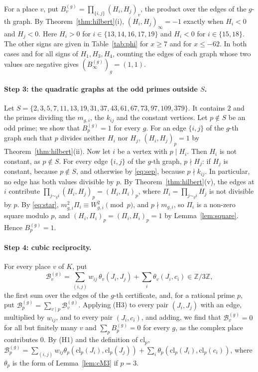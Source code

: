 \documentclass[11pt]{article}
\newcommand{\Z}{\mathbb{Z}}
\begin{document}
For a place $v$, put $B^{(g)}_v=\prod_{\{i,j\}}(H_i,H_j)_v$, the product over the edges of the $g$-th graph. By Theorem~\ref{thm:hilbert}(i), $(H_i,H_j)_\infty=-1$ exactly when $H_i<0$ and $H_j<0$. Here $H_i>0$ for $i\in\{13,\allowbreak 14,\allowbreak 16,\allowbreak 17,\allowbreak 19\}$ and $H_i<0$ for $i\in\{15,\allowbreak 18\}$. The other signs are given in Table~\ref{tab:phi} for $x\geq7$ and for $x\leq-62$. In both cases and for all signs of $H_{1}, H_{3}, H_{4}$, counting the edges of each graph whose two values are negative gives $(B^{(g)}_\infty)_g=(1,1)$.

\paragraph{Step 3: the quadratic graphs at the odd primes outside $S$.} Let $S=\{2,\allowbreak 3,\allowbreak 5,\allowbreak 7,\allowbreak 11,\allowbreak 13,\allowbreak 19,\allowbreak 31,\allowbreak 37,\allowbreak 43,\allowbreak 61,\allowbreak 67,\allowbreak 73,\allowbreak 97,\allowbreak 109,\allowbreak 379\}$. It contains $2$ and the primes dividing the $m_{g,i}$, the $k_{ij}$ and the constant vertices. Let $p\notin S$ be an odd prime; we show that $B^{(g)}_p=1$ for every $g$. For an edge $\{i,j\}$ of the $g$-th graph such that $p$ divides neither $H_i$ nor $H_j$, $(H_i,H_j)_p=1$ by Theorem~\ref{thm:hilbert}(ii). Now let $i$ be a vertex with $p\mid H_i$. Then $H_i$ is not constant, as $p\notin S$. For every edge $\{i,j\}$ of the $g$-th graph, $p\nmid H_j$: if $H_j$ is constant, because $p\notin S$, and otherwise by \eqref{eq:sep}, because $p\nmid k_{ij}$. In particular, no edge has both values divisible by $p$. By Theorem~\ref{thm:hilbert}(v), the edges at $i$ contribute $\prod_{j\sim_g i}(H_i,H_j)_p=(H_i,\Pi_i)_p$, where $\Pi_i=\prod_{j\sim_g i}H_j$ is not divisible by $p$. By \eqref{eq:star}, $m_{g,i}^2\Pi_i\equiv W_{g,i}^2\pmod p$, and $p\nmid m_{g,i}$, so $\Pi_i$ is a non-zero square modulo $p$, and $(H_i,\Pi_i)_p=(\Pi_i,H_i)_p=1$ by Lemma~\ref{lem:square}. Hence $B^{(g)}_p=1$.

\paragraph{Step 4: cubic reciprocity.} For every place $v$ of $K$, put
\begin{equation}\label{eq:cB}
\mathcal B^{(g)}_v=\sum_{(i,j)}w_{ij}\,\theta_v(J_i,J_j)+\sum_i\theta_v(J_i,c_i)\in\Z/3\Z,
\end{equation}
the first sum over the edges of the $g$-th certificate, and, for a rational prime $p$, put $\mathcal B^{(g)}_p=\sum_{v\mid p}\mathcal B^{(g)}_v$. Applying (H3) to every pair $(J_i,J_j)$ with an edge, multiplied by $w_{ij}$, and to every pair $(J_i,c_i)$, and adding, we find that $\mathcal B^{(g)}_v=0$ for all but finitely many $v$ and $\sum_pB^{(g)}_p=0$ for every $g$, as the complex place contributes $0$. By (H1) and the definition of $\mathrm{cl}_p$, $\mathcal B^{(g)}_p=\sum_{(i,j)}w_{ij}\theta_p(\mathrm{cl}_p(J_i),\mathrm{cl}_p(J_j))+\sum_i\theta_p(\mathrm{cl}_p(J_i),\mathrm{cl}_p(c_i))$, where $\theta_p$ is the form of Lemma~\ref{lem:cM3} if $p=3$.
\end{document}
